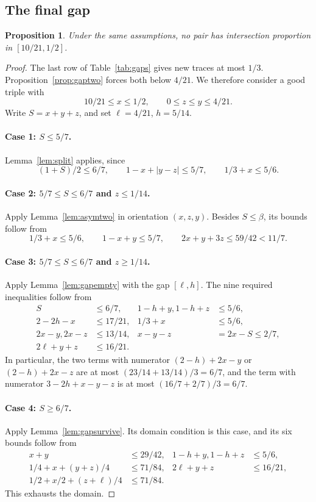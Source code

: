 \documentclass[11pt]{article}
\numberwithin{equation}{section}
\newtheorem{proposition}[theorem]{Proposition}
\theoremstyle{definition}
\theoremstyle{remark}
\begin{document}
\subsection{The final gap}
\begin{proposition}\label{prop:gapthree}
Under the same assumptions, no pair has intersection proportion in
$[10/21,1/2]$.
\end{proposition}
\begin{proof}
The last row of Table~\ref{tab:gaps} gives new traces at most $1/3$.
Proposition~\ref{prop:gaptwo} forces both below $4/21$. We therefore
consider a good triple with
\[
 10/21\le x\le1/2,\qquad 0\le z\le y\le4/21.
\]
Write $S=x+y+z$, and set $\ell=4/21$, $h=5/14$.

\paragraph{Case 1: $S\le5/7$.}
Lemma~\ref{lem:split} applies, since
\[
 (1+S)/2\le6/7,\qquad 1-x+|y-z|\le5/7,\qquad 1/3+x\le5/6.
\]

\paragraph{Case 2: $5/7\le S\le6/7$ and $z\le1/14$.}
Apply Lemma~\ref{lem:asymtwo} in orientation $(x,z,y)$.
Besides $S\le\beta$, its bounds follow from
\[
 1/3+x\le5/6,\qquad 1-x+y\le5/7,\qquad
 2x+y+3z\le59/42<11/7.
\]

\paragraph{Case 3: $5/7\le S\le6/7$ and $z\ge1/14$.}
Apply Lemma~\ref{lem:gapempty} with the gap $[\ell,h]$.
The nine required inequalities follow from
\begin{align*}
 S&\le6/7,&1-h+y, 1-h+z&\le5/6,\\
 2-2h-x&\le17/21,&1/3+x&\le5/6,\\
 2x-y, 2x-z&\le13/14,&x-y-z&=2x-S\le2/7,\\
 2\ell+y+z&\le16/21.
\end{align*}
In particular, the two terms with numerator $(2-h)+2x-y$ or
$(2-h)+2x-z$ are at most $(23/14+13/14)/3=6/7$, and the term with
numerator $3-2h+x-y-z$ is at most $(16/7+2/7)/3=6/7$.

\paragraph{Case 4: $S\ge6/7$.}
Apply Lemma~\ref{lem:gapsurvive}. Its domain condition is this case,
and its six bounds follow from
\begin{align*}
 x+y&\le29/42,&1-h+y, 1-h+z&\le5/6,\\
 1/4+x+(y+z)/4&\le71/84,&2\ell+y+z&\le16/21,\\
 1/2+x/2+(z+\ell)/4&\le71/84.
\end{align*}
This exhausts the domain.
\end{proof}
\end{document}
